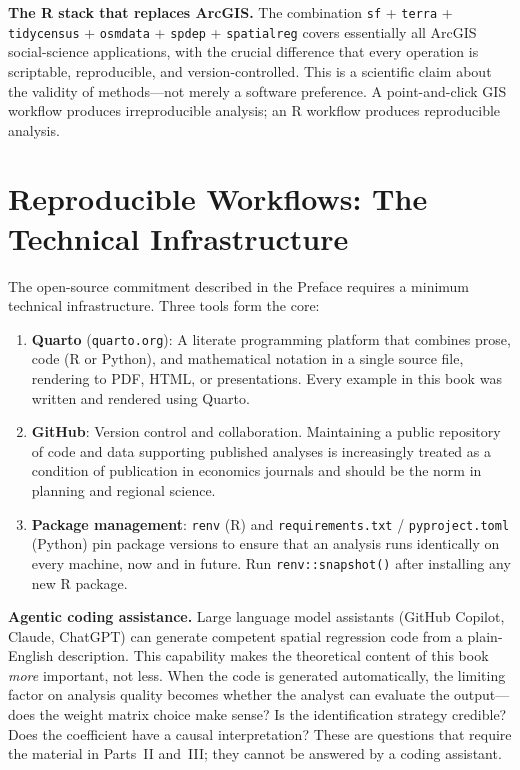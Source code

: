 \noindent\textbf{The R stack that replaces ArcGIS.} The combination
\texttt{sf} + \texttt{terra} + \texttt{tidycensus} + \texttt{osmdata} +
\texttt{spdep} + \texttt{spatialreg} covers essentially all ArcGIS
social-science applications, with the crucial difference that every operation
is scriptable, reproducible, and version-controlled. This is a scientific
claim about the validity of methods---not merely a software preference. A
point-and-click GIS workflow produces irreproducible analysis; an R workflow
produces reproducible analysis.


\section{Reproducible Workflows: The Technical Infrastructure}
\label{sec_Reproducible}

The open-source commitment described in the Preface requires a minimum
technical infrastructure. Three tools form the core:

\begin{enumerate}
  \item \textbf{Quarto} (\texttt{quarto.org}): A literate programming
    platform that combines prose, code (R or Python), and mathematical
    notation in a single source file, rendering to PDF, HTML, or
    presentations. Every example in this book was written and rendered
    using Quarto.

  \item \textbf{GitHub}: Version control and collaboration. Maintaining a
    public repository of code and data supporting published analyses is
    increasingly treated as a condition of publication in economics journals
    and should be the norm in planning and regional science.

  \item \textbf{Package management}: \texttt{renv} (R) and
    \texttt{requirements.txt} / \texttt{pyproject.toml} (Python) pin
    package versions to ensure that an analysis runs identically on every
    machine, now and in future. Run \texttt{renv::snapshot()} after
    installing any new R package.
\end{enumerate}

\noindent\textbf{Agentic coding assistance.} Large language model assistants
(GitHub Copilot, Claude, ChatGPT) can generate competent spatial regression
code from a plain-English description. This capability makes the theoretical
content of this book \emph{more} important, not less. When the code is
generated automatically, the limiting factor on analysis quality becomes
whether the analyst can evaluate the output---does the weight matrix choice
make sense? Is the identification strategy credible? Does the coefficient
have a causal interpretation? These are questions that require the material
in Parts~II and~III; they cannot be answered by a coding assistant.

